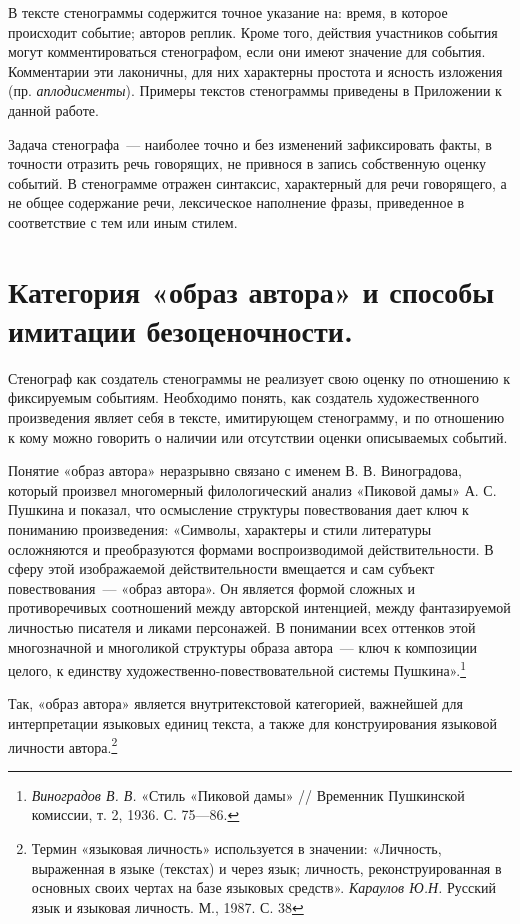 \documentclass{kursa4}
\begin{document}
      В тексте стенограммы содержится точное указание на: время, в которое происходит событие; авторов реплик. Кроме того, действия участников события могут комментироваться стенографом, если они имеют значение для события. Комментарии эти лаконичны, для них характерны простота и ясность изложения (пр. \textit{аплодисменты}). Примеры текстов стенограммы приведены в Приложении к данной работе. 

      Задача стенографа~--- наиболее точно и без изменений зафиксировать факты, в точности отразить речь говорящих, не привнося в запись собственную оценку событий. В стенограмме отражен синтаксис, характерный для речи говорящего, а не общее содержание речи, лексическое наполнение фразы, приведенное в соответствие с тем или иным стилем. 

    \section{Категория «образ автора» и способы имитации безоценочности.}

      Стенограф как создатель стенограммы не реализует свою оценку по отношению к фиксируемым событиям. Необходимо понять, как создатель художественного произведения являет себя в тексте, имитирующем стенограмму, и по отношению к кому можно говорить о наличии или отсутствии оценки описываемых событий. 

      Понятие «образ автора» неразрывно связано с именем В. В. Виноградова, который произвел многомерный филологический анализ «Пиковой дамы» А. С. Пушкина и показал, что осмысление структуры повествования дает ключ к пониманию произведения: «Символы, характеры и стили литературы осложняются и преобразуются формами воспроизводимой действительности. В сферу этой изображаемой действительности вмещается и сам субъект повествования~--- «образ автора». Он является формой сложных и противоречивых соотношений между авторской интенцией, между фантазируемой личностью писателя и ликами персонажей. В понимании всех оттенков этой многозначной и многоликой структуры образа автора~--- ключ к композиции целого, к единству художественно-повествовательной системы Пушкина».\footnote{\textit{{Виноградов В. В. }}{«Стиль «Пиковой дамы» // Временник Пушкинской комиссии, т. 2, 1936. С. 75—86.}} 

      Так, «образ автора» является внутритекстовой категорией, важнейшей для интерпретации языковых единиц текста, а также для конструирования языковой личности автора.\footnote{{Термин «языковая личность» используется в значении: «Личность, выраженная в языке (текстах) и через язык; личность, реконструированная в основных своих чертах на базе языковых средств». }\textit{{Караулов Ю.Н. }}{Русский язык и языковая личность. М., 1987. С. 38}} 
\end{document}
